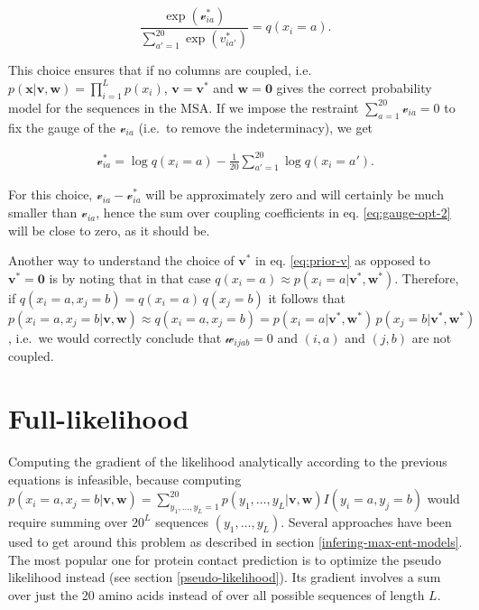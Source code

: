\documentclass[12pt,a4paper,twoside]{book}
\newcommand{\eq}{\!=\!}
\newcommand{\seq}{\mathbf{x}}
\renewcommand{\v}{\mathbf{v}}
\newcommand{\via}{\mathcal{v}_{ia}}
\newcommand{\w}{\mathbf{w}}
\newcommand{\wijab}{\mathcal{w}_{ijab}}
\theoremstyle{definition}
\theoremstyle{definition}
\theoremstyle{remark}
\begin{document}
\begin{equation}
  \frac{\exp(\via^*)}{\sum_{a'=1}^{20} \exp(v_{ia'}^*)} = q(x_i=a) .
\end{equation}

This choice ensures that if no columns are coupled, i.e.
\(p(\seq | \v,\w) = \prod_{i=1}^L p(x_i)\), \(\v=\v^*\) and
\(\w= \mathbf{0}\) gives the correct probability model for the sequences
in the MSA. If we impose the restraint \(\sum_{a=1}^{20} \via = 0\) to
fix the gauge of the \(\via\) (i.e.~to remove the indeterminacy), we get

\begin{align}
\via^* = \log q(x_i=a) - \frac{1}{20} \sum_{a'=1}^{20} \log q(x_i=a') .
\label{eq:prior-v}
\end{align}

For this choice, \(\via - \via^*\) will be approximately zero and will
certainly be much smaller than \(\via\), hence the sum over coupling
coefficients in eq. \eqref{eq:gauge-opt-2} will be close to zero, as it
should be.

Another way to understand the choice of \(\v^*\) in eq. \eqref{eq:prior-v}
as opposed to \(\v^*=\mathbf{0}\) is by noting that in that case
\(q(x_i \eq a) \approx p(x_i \eq a|\v^*,\w^*)\). Therefore, if
\(q(x_i \eq a,x_j \eq b) = q(x_i \eq a) \, q(x_j \eq b)\) it follows
that
\(p(x_i \eq a, x_j \eq b | \v,\w) \approx q(x_i \eq a, x_j \eq b) = p(x_i \eq a | \v^*,\w^*)\, p(x_j \eq b | \v^*,\w^*)\),
i.e.~we would correctly conclude that \(\wijab=0\) and \((i,a)\) and
\((j,b)\) are not coupled.

\section{Full-likelihood}\label{full-likelihood}

Computing the gradient of the likelihood analytically according to the
previous equations is infeasible, because computing
\(p(x_i \eq a, x_j \eq b | \v, \w) = \sum_{y_1, \dots, y_L =1}^{20} p(y_1, \dots, y_L | \v, \w) I(y_i \eq a, y_j \eq b)\)
would require summing over \(20^L\) sequences \((y_1,\ldots,y_L)\).
Several approaches have been used to get around this problem as
described in section \ref{infering-max-ent-models}. The most popular one
for protein contact prediction is to optimize the pseudo likelihood
instead (see section \ref{pseudo-likelihood}). Its gradient involves a
sum over just the 20 amino acids instead of over all possible sequences
of length \(L\).
\end{document}
